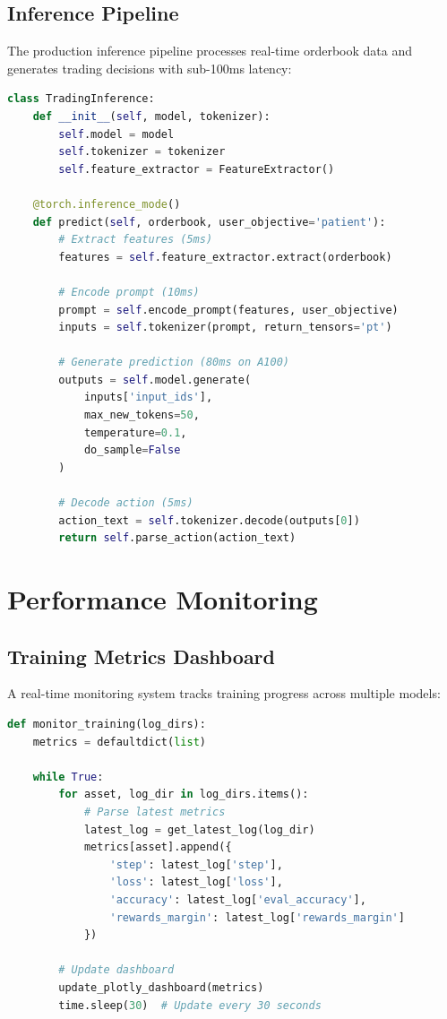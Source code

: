\documentclass{report}
\begin{document}
\subsection{Inference Pipeline}

The production inference pipeline processes real-time orderbook data and generates trading decisions with sub-100ms latency:

\begin{lstlisting}[language=Python, caption=Real-time inference pipeline]
class TradingInference:
    def __init__(self, model, tokenizer):
        self.model = model
        self.tokenizer = tokenizer
        self.feature_extractor = FeatureExtractor()
        
    @torch.inference_mode()
    def predict(self, orderbook, user_objective='patient'):
        # Extract features (5ms)
        features = self.feature_extractor.extract(orderbook)
        
        # Encode prompt (10ms)
        prompt = self.encode_prompt(features, user_objective)
        inputs = self.tokenizer(prompt, return_tensors='pt')
        
        # Generate prediction (80ms on A100)
        outputs = self.model.generate(
            inputs['input_ids'],
            max_new_tokens=50,
            temperature=0.1,
            do_sample=False
        )
        
        # Decode action (5ms)
        action_text = self.tokenizer.decode(outputs[0])
        return self.parse_action(action_text)
\end{lstlisting}

\section{Performance Monitoring}

\subsection{Training Metrics Dashboard}

A real-time monitoring system tracks training progress across multiple models:

\begin{lstlisting}[language=Python, caption=Training monitor implementation]
def monitor_training(log_dirs):
    metrics = defaultdict(list)
    
    while True:
        for asset, log_dir in log_dirs.items():
            # Parse latest metrics
            latest_log = get_latest_log(log_dir)
            metrics[asset].append({
                'step': latest_log['step'],
                'loss': latest_log['loss'],
                'accuracy': latest_log['eval_accuracy'],
                'rewards_margin': latest_log['rewards_margin']
            })
        
        # Update dashboard
        update_plotly_dashboard(metrics)
        time.sleep(30)  # Update every 30 seconds
\end{lstlisting}
\end{document}
